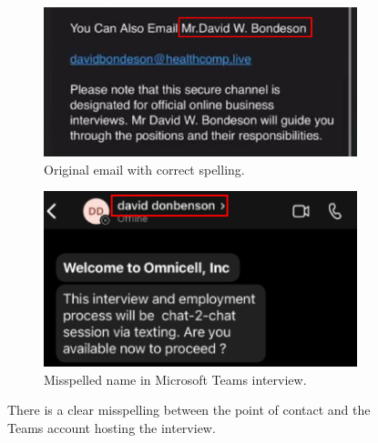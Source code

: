 \begin{fullwidth}
    \begin{figure}[H] %
        \label{sec:Fig16}
        \centering
        \begin{subfigure}{0.5\textwidth}
            \centering
            \includegraphics[width=1.37\linewidth]{assets/BondesonEmail.png}
            \captionsetup{justification=centering}
            \caption{Original email with correct spelling.}
        \end{subfigure}
        \hfill
        \begin{subfigure}{0.5\textwidth}
            \centering
            \includegraphics[width=1.37\linewidth]{assets/TeamsNamepng.png}
            \captionsetup{justification=centering}
            \caption{Misspelled name in Microsoft Teams interview.}
        \end{subfigure}
        \hfill
        \captionsetup{justification=centering}
        \caption{There is a clear misspelling between the point of contact and the Teams account hosting the interview.}
    \end{figure}

\end{fullwidth}